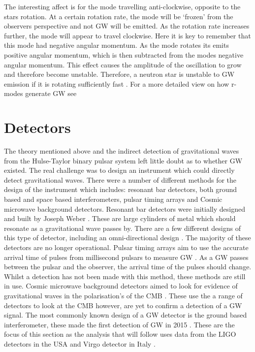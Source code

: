 The interesting affect is for the mode travelling anti-clockwise, opposite to the stars rotation. 
At a certain rotation rate, the mode will be `frozen' from the observers perspective and not \ac{GW} will be emitted.
As the rotation rate increases further, the mode will appear to travel clockwise. 
Here it is key to remember that this mode had negative angular momentum.
As the mode rotates its emits positive angular momentum, which is then subtracted from the modes negative angular momentum.
This effect causes the amplitude of the oscillation to grow and therefore become unstable.
Therefore, a neutron star is unstable to \ac{GW} emission if it is rotating sufficiently fast \citep{lasky2015GravitationalWaves}.
For a more detailed view on how r-modes generate \ac{GW} see \citep{owen1998GravitationalWaves}


\section{\label{intro:detector}Detectors}

The theory mentioned above and the indirect detection of gravitational waves from the Hulse-Taylor binary pulsar system left little doubt as to whether \ac{GW} existed. 
The real challenge was to design an instrument which could directly detect gravitational waves.
There were a number of different methods for the design of the instrument which includes: resonant bar detectors, both ground based and space based interferometers, pulsar timing arrays and Cosmic microwave background detectors. 
Resonant bar detectors were initially designed and built by Joseph Weber \citep{weber1966ObservationThermal}.
These are large cylinders of metal which should resonate as a gravitational wave passes by. 
There are a few different designs of this type of detector, including an omni-directional design \citep{dewaard2003MiniGRAILFirst}.
The majority of these detectors are no longer operational.
Pulsar timing arrays aim to use the accurate arrival time of pulses from millisecond pulsars to measure \ac{GW} \citep{hobbs2017GravitationalWave}. As a \ac{GW} passes between the pulsar and the observer, the arrival time of the pulses should change. 
Whilst a detection has not been made with this method, these methods are still in use.
Cosmic microwave background detectors aimed to look for evidence of gravitational waves in the polarisation's of the CMB \citep{ade2018ConstraintsPrimordial}. 
These use the a range of detectors to look at the CMB however, are yet to confirm a detection of a \ac{GW} signal.
The most commonly known design of a \ac{GW} detector is the ground based interferometer, these made the first detection of \ac{GW} in 2015 \citep{abbott2016ObservationGravitational}.
These are the focus of this section as the analysis that will follow uses data from the \ac{LIGO} detectors in the USA \citep{abbott2009LIGOLaser,aasi2015AdvancedLIGO} and Virgo detector in Italy \citep{acernese2015AdvancedVirgo,acernese2008StatusVirgo}.

